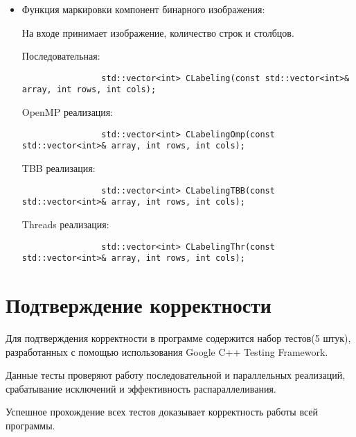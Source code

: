 \documentclass{report}
\begin{document}
\begin{itemize}
			\item Функция маркировки компонент бинарного изображения:
			\par На входе принимает изображение, количество строк и столбцов.
			\par Последовательная:
			\begin{lstlisting}
				std::vector<int> CLabeling(const std::vector<int>& array, int rows, int cols);
			\end{lstlisting}
			\par OpenMP реализация:
			\begin{lstlisting}
				std::vector<int> CLabelingOmp(const std::vector<int>& array, int rows, int cols);
			\end{lstlisting}
			\par TBB реализация:
			\begin{lstlisting}
				std::vector<int> CLabelingTBB(const std::vector<int>& array, int rows, int cols);
			\end{lstlisting}
			\par Threads реализация:
			\begin{lstlisting}
				std::vector<int> CLabelingThr(const std::vector<int>& array, int rows, int cols);
			\end{lstlisting}
		\end{itemize}
	\newpage


	\section*{Подтверждение корректности}
	Для подтверждения корректности в программе содержится набор тестов(5 штук), разработанных с помощью использования Google C++ Testing Framework.
	\par Данные тесты проверяют работу последовательной и параллельных реализаций, срабатывание исключений и эффективность распараллеливания.
	\par Успешное прохождение всех тестов доказывает корректность работы всей программы.
	\newpage


\end{document}
